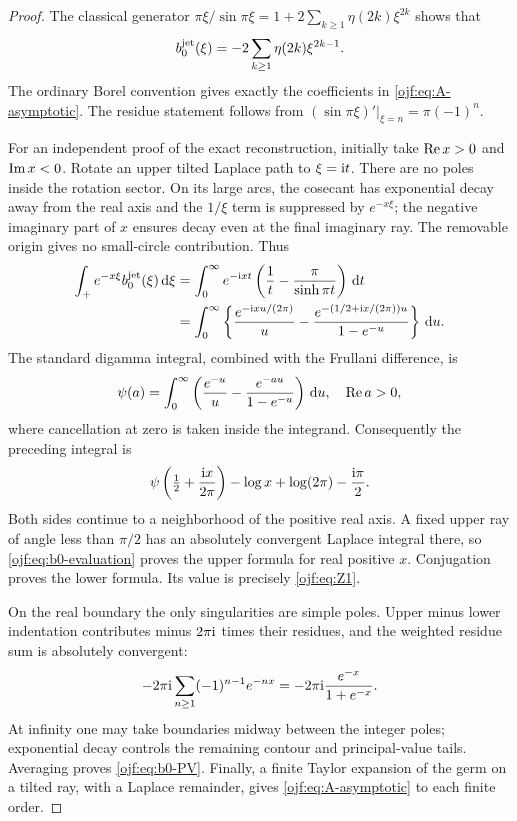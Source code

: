\begin{proof}
The classical generator
$\pi\xi/\sin\pi\xi=1+2\sum_{k\ge1}\eta(2k)\xi^{2k}$
shows that
\[
 b_0^{\rm jet}(\xi)=-2\sum_{k\ge1}\eta(2k)\xi^{2k-1}.
\]
The ordinary Borel convention gives exactly the coefficients in
\eqref{ojf:eq:A-asymptotic}. The residue statement follows from
$(\sin\pi\xi)'|_{\xi=n}=\pi(-1)^n$.

For an independent proof of the exact reconstruction, initially take
$\operatorname{Re} x>0$ and $\operatorname{Im} x<0$. Rotate an upper tilted Laplace path to
$\xi=\mathrm{i} t$. There are no poles inside the rotation sector. On its
large arcs, the cosecant has exponential decay away from the real
axis and the $1/\xi$ term is suppressed by $e^{-x\xi}$; the negative
imaginary part of $x$ ensures decay even at the final imaginary ray.
The removable origin gives no small-circle contribution. Thus
\begin{align*}
 \int_+e^{-x\xi}b_0^{\rm jet}(\xi)\,\mathrm d\xi
 &=\int_0^\infty e^{-\mathrm{i} xt}
                   \left(\frac1t-\frac\pi{\sinh\pi t}\right)\,\mathrm d t\\
 &=\int_0^\infty
       \left\{\frac{e^{-\mathrm{i} xu/(2\pi)}}u
          -\frac{e^{-(1/2+\mathrm{i} x/(2\pi))u}}{1-e^{-u}}\right\}\,\mathrm d u.
\end{align*}
The standard digamma integral, combined with the Frullani difference,
is \cite[\S5.9]{ojf:DLMFDigamma}
\[
 \psi(a)=\int_0^\infty
          \left(\frac{e^{-u}}u-\frac{e^{-au}}{1-e^{-u}}\right)\,\mathrm d u,
 \quad \operatorname{Re} a>0,
\]
where cancellation at zero is taken inside the integrand. Consequently
the preceding integral is
\begin{equation}\label{ojf:eq:b0-evaluation}
 \psi\left(\tfrac12+\frac{\mathrm{i} x}{2\pi}\right)
                 -\log x+\log(2\pi)-\frac{\mathrm{i}\pi}{2}.
\end{equation}
Both sides continue to a neighborhood of the positive real axis. A fixed
upper ray of angle less than $\pi/2$ has an absolutely convergent
Laplace integral there, so \eqref{ojf:eq:b0-evaluation} proves the upper
formula for real positive $x$. Conjugation proves the lower formula.
Its value is precisely \eqref{ojf:eq:Z1}.

On the real boundary the only singularities are simple poles. Upper
minus lower indentation contributes minus $2\pi\mathrm{i}$ times their
residues, and the weighted residue sum is absolutely convergent:
\[
 -2\pi\mathrm{i}\sum_{n\ge1}(-1)^{n-1}e^{-nx}
          =-2\pi\mathrm{i}\frac{e^{-x}}{1+e^{-x}}.
\]
At infinity one may take boundaries midway between the integer poles;
exponential decay controls the remaining contour and principal-value
tails. Averaging proves \eqref{ojf:eq:b0-PV}.
Finally, a finite Taylor expansion of the germ on a tilted ray, with a
Laplace remainder, gives \eqref{ojf:eq:A-asymptotic} to each finite order.
\end{proof}

